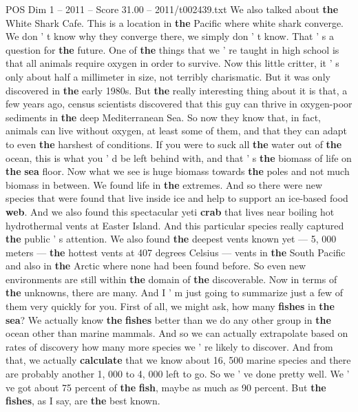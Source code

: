 \begin{textsample}{POS Dim 1 – 2011 – Score 31.00 – 2011/t002439.txt}
We also talked about \textbf{the} White Shark Cafe.
This is a location in \textbf{the} Pacific where white shark converge.
We don ' t know why they converge there, we simply don ' t know.
That ' s a question for \textbf{the} future.
One of \textbf{the} things that we ' re taught in high school is that all animals require oxygen in order to survive.
Now this little critter, it ' s only about half a millimeter in size, not terribly charismatic.
But it was only discovered in \textbf{the} early 1980s.
But \textbf{the} really interesting thing about it is that, a few years ago, census scientists discovered that this guy can thrive in oxygen-poor sediments in \textbf{the} deep Mediterranean Sea.
So now they know that, in fact, animals can live without oxygen, at least some of them, and that they can adapt to even \textbf{the} harshest of conditions.
If you were to suck all \textbf{the} water out of \textbf{the} ocean, this is what you ' d be left behind with, and that ' s \textbf{the} biomass of life on \textbf{the} \textbf{sea} floor.
Now what we see is huge biomass towards \textbf{the} poles and not much biomass in between.
We found life in \textbf{the} extremes.
And so there were new species that were found that live inside ice and help to support an ice-based food \textbf{web}.
And we also found this spectacular yeti \textbf{crab} that lives near boiling hot hydrothermal vents at Easter Island.
And this particular species really captured \textbf{the} public ' s attention.
We also found \textbf{the} deepest vents known yet — 5, 000 meters — \textbf{the} hottest vents at 407 degrees Celsius — vents in \textbf{the} South Pacific and also in \textbf{the} Arctic where none had been found before.
So even new environments are still within \textbf{the} domain of \textbf{the} discoverable.
Now in terms of \textbf{the} unknowns, there are many.
And I ' m just going to summarize just a few of them very quickly for you.
First of all, we might ask, how many \textbf{fishes} in \textbf{the} \textbf{sea}?
We actually know \textbf{the} \textbf{fishes} better than we do any other group in \textbf{the} ocean other than marine mammals.
And so we can actually extrapolate based on rates of discovery how many more species we ' re likely to discover.
And from that, we actually \textbf{calculate} that we know about 16, 500 marine species and there are probably another 1, 000 to 4, 000 left to go.
So we ' ve done pretty well.
We ' ve got about 75 percent of \textbf{the} \textbf{fish}, maybe as much as 90 percent.
But \textbf{the} \textbf{fishes}, as I say, are \textbf{the} best known.

\end{textsample}
